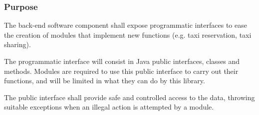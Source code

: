 \label{sec:api}
\subsubsection{Purpose}

The back-end software component shall expose programmatic interfaces to ease the creation of modules that implement new functions (e.g. taxi reservation, taxi sharing).

The programmatic interface will consist in Java public interfaces, classes and methods.
Modules are required to use this public interface to carry out their functions, and will be limited in what they can do by this library.

The public interface shall provide safe and controlled access to the data, throwing suitable exceptions when an illegal action is attempted by a module.


